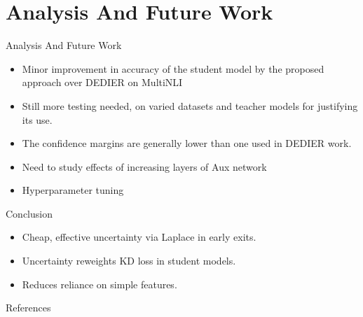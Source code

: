 \documentclass[aspectratio=169,xcolor=dvipsnames]{beamer}
\begin{document}
\section{Analysis And Future Work}
\begin{frame}{Analysis And Future Work}
    \begin{itemize}
        \item Minor improvement in accuracy of the student model by the proposed approach over DEDIER on MultiNLI
        \item Still more testing needed, on varied datasets and teacher models for justifying its use.
        \item The confidence margins are generally lower than one used in DEDIER work.
        \item Need to study effects of increasing layers of Aux network
        \item Hyperparameter tuning 
    \end{itemize}
\end{frame}
\begin{frame}{Conclusion}
    \begin{itemize}
        \item Cheap, effective uncertainty via Laplace in early exits.
        \item Uncertainty reweights KD loss in student models.
        \item Reduces reliance on simple features.
    \end{itemize}
\end{frame}



\begin{frame}{References}
    \footnotesize
    
    
\end{frame}
\end{document}
